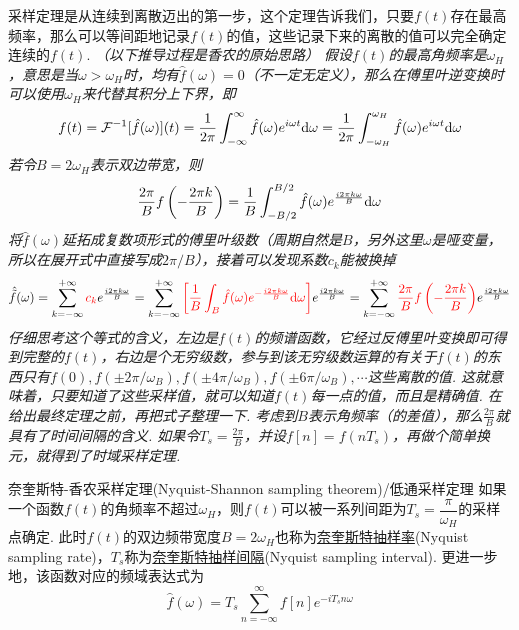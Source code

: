 采样定理是从连续到离散迈出的第一步，这个定理告诉我们，只要\(f(t)\)存在最高频率，那么可以等间距地记录\(f(t)\)的值，这些记录下来的离散的值可以完全确定连续的\(f(t)\).
\textit{
\newline
（以下推导过程是香农的原始思路）
\newline
假设\(f(t)\)的最高角频率是\(\omega_H\)，意思是当\(\omega > \omega_H\)时，均有\(\hat{f}(\omega)=0\)（不一定无定义），那么在傅里叶逆变换时可以使用\(\omega_H\)来代替其积分上下界，即
\[f(t) = \mathcal{F}^{-1}[\hat{f}(\omega)](t) = \frac{1}{2\pi}\int_{-\infty}^{\infty}\hat{f}(\omega)e^{i\omega t}{\rm d}\omega = \frac{1}{2\pi}\int_{-\omega_H}^{\omega_H}\hat{f}(\omega)e^{i\omega t}{\rm d}\omega\]
若令\(B=2\omega_H\)表示双边带宽，则
\[\frac{2\pi}{B}f\left(-\frac{2\pi k}{B}\right) = \frac{1}{B}\int_{-B/2}^{B/2}\hat{f}(\omega)e^{\frac{i2\pi k\omega}{B}}{\rm d}\omega\]
将\(\hat{f}(\omega)\)延拓成复数项形式的傅里叶级数（周期自然是\(B\)，另外这里\(\omega\)是哑变量，所以在展开式中直接写成\(2\pi/B\)），接着可以发现系数\(c_k\)能被换掉
\[ \hat{\tilde{f}}(\omega) = \sum_{k=-\infty}^{+\infty}{\color{red} c_k}e^{\frac{i2\pi k\omega}{B}} 
= \sum_{k=-\infty}^{+\infty} {\color{red} \left[\frac{1}{B} \int_{B}\hat{f}(\omega)e^{-\frac{i2\pi k\omega}{B}}{\rm d}\omega\right]}e^{\frac{i2\pi k\omega}{B}} 
= \sum_{k=-\infty}^{+\infty} {\color{red} \frac{2\pi}{B}f\left(-\frac{2\pi k}{B}\right)}e^{\frac{i2\pi k\omega}{B}}\]
仔细思考这个等式的含义，左边是\(f(t)\)的频谱函数，它经过反傅里叶变换即可得到完整的\(f(t)\)，右边是个无穷级数，参与到该无穷级数运算的有关于\(f(t)\)的东西只有\(f(0), f(\pm 2\pi/\omega_B), f(\pm 4\pi/\omega_B), f(\pm 6\pi/\omega_B), \cdots\)这些离散的值. 这就意味着，只要知道了这些采样值，就可以知道\(f(t)\)每一点的值，而且是精确值.
\newline
在给出最终定理之前，再把式子整理一下. 考虑到\(B\)表示角频率（的差值），那么\(\displaystyle{\frac{2\pi}{B}}\)就具有了时间间隔的含义. 如果令\(\displaystyle{T_s=\frac{2\pi}{B}}\)，并设\(\displaystyle{f[n]=f(nT_s)}\)，再做个简单换元，就得到了时域采样定理.
}

\begin{theorem}{奈奎斯特-香农采样定理(Nyquist-Shannon sampling theorem)/低通采样定理}
    如果一个函数\(f(t)\)的角频率不超过\(\omega_H\)，则\(f(t)\)可以被一系列间距为\(T_s=\dfrac{\pi}{\omega_H}\)的采样点确定. 此时\(f(t)\)的双边频带宽度\(B=2\omega_H\)也称为\uline{奈奎斯特抽样率}(Nyquist sampling rate)，\(T_s\)称为\uline{奈奎斯特抽样间隔}(Nyquist sampling interval). 更进一步地，该函数对应的频域表达式为
    \[\hat{f}(\omega) = T_s \sum_{n=-\infty}^{\infty}f[n]e^{-iT_sn\omega}\]
\end{theorem}

